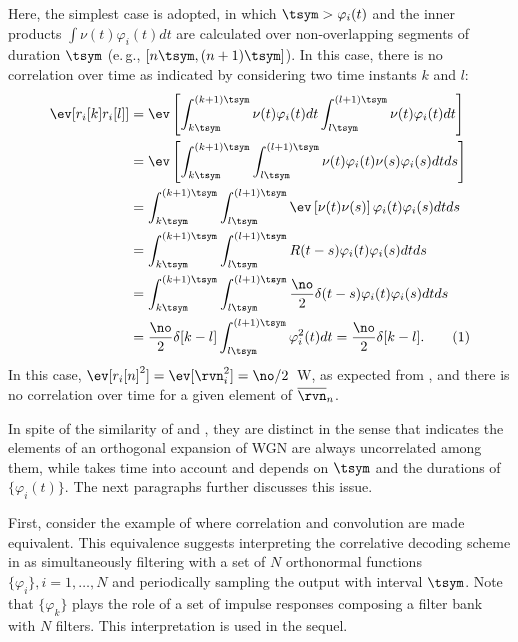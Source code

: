 Here, the simplest case is adopted, in which $\tsym > \varphi_i(t)$ and the inner products $\int \nu(t)\varphi_i(t) dt$ are calculated over non-overlapping segments of duration $\tsym$ (e.\,g., $[n\tsym, (n+1)\tsym]$). In this case, there is no correlation over time as indicated by considering two time instants $k$ and $l$:
\begin{align*}
\ev[r_i[k] r_i[l]] &= \ev \left[ \int_{k\tsym}^{(k+1)\tsym}{\nu(t)\varphi_i(t) dt} \int_{l\tsym}^{(l+1)\tsym}{\nu(t)\varphi_i(t) dt} \right] \\
 &= \ev \left[ \int_{k\tsym}^{(k+1)\tsym}\int_{l\tsym}^{(l+1)\tsym}{\nu(t)\varphi_i(t) \nu(s)\varphi_i(s) dt ds} \right] \\
 &= \int_{k\tsym}^{(k+1)\tsym}\int_{l\tsym}^{(l+1)\tsym} { \ev \left[ \nu(t) \nu(s) \right] \varphi_i(t) \varphi_i(s) dt ds} \\
 &= \int_{k\tsym}^{(k+1)\tsym}\int_{l\tsym}^{(l+1)\tsym} { R(t-s)  \varphi_i(t) \varphi_i(s) dt ds} \\
 &=  \int_{k\tsym}^{(k+1)\tsym}\int_{l\tsym}^{(l+1)\tsym} { \frac{\no}{2} \delta(t-s) \varphi_i(t) \varphi_i(s) dt ds} \\
 &= \frac{\no}{2} \delta[k-l] \int_{l\tsym}^{(l+1)\tsym}{\varphi_i^2(t) } dt = \frac{\no}{2} \delta[k-l].
\stepcounter{equation}\tag{\theequation} \label{eq:uncorrelatedOverTime}
\end{align*}	
In this case, $\ev[r_i[n]^2]=\ev[\rvn_i^2]=\no/2$~W, as expected from , and there is no correlation over time for a given element of $\overline \rvn_n$.

In spite of the similarity of  and , they are distinct in the sense that  indicates the elements of an orthogonal expansion of WGN are always uncorrelated among them, while  takes time into account and depends on $\tsym$ and the durations of $\{\varphi_i(t)\}$. 
The next paragraphs further discusses this issue.

First, consider the example of  where correlation and convolution are made equivalent. This equivalence suggests interpreting the correlative decoding scheme in  as 
simultaneously filtering with a set of $N$ orthonormal functions $\{ \varphi_i \}, i=1,\ldots,N$ and periodically sampling the output with interval $\tsym$. Note that $\{ \varphi_k \}$ plays the role of a set of impulse responses composing a filter bank with $N$ filters. This interpretation is used in the sequel.

